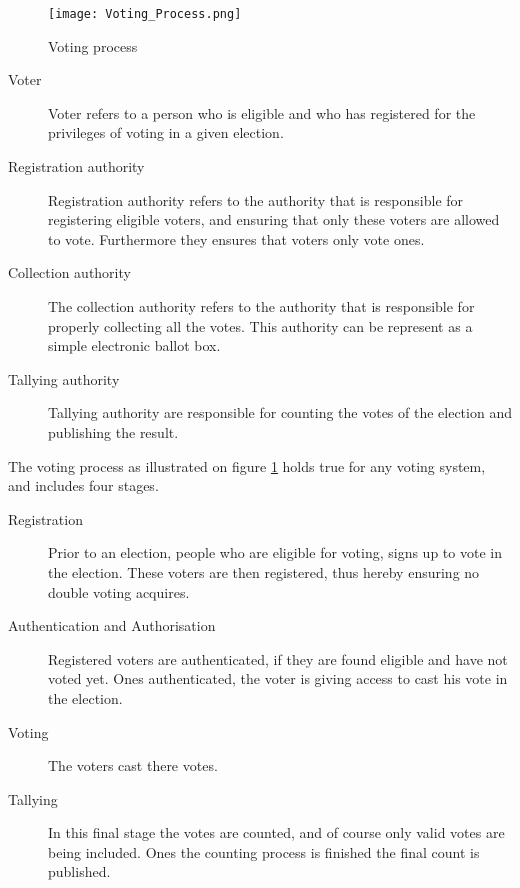 \begin{figure}[H]
\centering
\texttt{[image: Voting\_Process.png]}

\caption{Voting process}
\label{fig:Voting_Process}
\end{figure}

\begin{description}
    \item[Voter] Voter refers to a person who is eligible and who has registered for the privileges of voting in a given election. 
        
    \item[Registration authority] Registration authority refers to the authority that is responsible for registering eligible voters, and ensuring that only these voters are allowed to vote. Furthermore they ensures that voters only vote ones. 
        
    \item[Collection authority] The collection authority refers to the authority that is responsible for properly collecting all the votes. This authority can be represent as a simple electronic ballot box.

    \item[Tallying authority] Tallying authority are responsible for counting the votes of the election and publishing the result. 
\end{description}


\noindent
The voting process as illustrated on figure \ref{fig:Voting_Process} holds true for any voting system, and includes four stages. 

\begin{description}
    \item[Registration] Prior to an election, people who are eligible for voting, signs up to vote in the election. These voters are then registered, thus hereby ensuring no double voting acquires.
        
    \item[Authentication and Authorisation] Registered voters are authenticated, if they are found eligible and have not voted yet. Ones authenticated, the voter is giving access to cast his vote in the election.  
        
    \item[Voting] The voters cast there votes. 

    \item[Tallying] In this final stage the votes are counted, and of course only valid votes are being included. Ones the counting process is finished the final count is published. 
\end{description}

